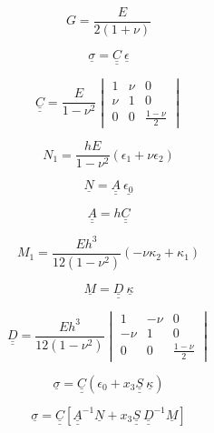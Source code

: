 		\begin{equation}
		G = \frac{E}{2(1+\nu)}
		\end{equation}

		\begin{equation}\label{eq:2.88}
		\underline{\sigma} = \underline{\underline{C}}\ \underline{\epsilon}
		\end{equation}

		\begin{equation}
		\underline{\underline{C}} = \frac{E}{1-\nu^2}
		\begin{vmatrix}
		  1 & \nu & 0 \\
		  \nu & 1 & 0 \\
		  0 & 0 & \frac{1-\nu}{2}
		\end{vmatrix}
		\end{equation}

		\begin{equation}\label{eq:2.90}
		N_1 = \frac{hE}{1-\nu^2} \left( \epsilon_1 + \nu \epsilon_2 \right)
		\end{equation}

		\begin{equation}\label{eq2.107}
		\underline{N} = \underline{\underline{A}} \ \underline{\epsilon_0}
		\end{equation}
				
		\begin{equation}
		\underline{\underline{A}} = h\underline{\underline{C}}
		\end{equation}

		\begin{equation}
		M_1 = \frac{Eh^3}{12(1-\nu^2)} \left( -\nu \kappa_2 + \kappa_1 \right)
		\end{equation}

		\begin{equation}\label{eq2.110}
		\underline{M} = \underline{\underline{D}} \ \underline{\kappa}
		\end{equation}

		\begin{equation}
		\underline{\underline{D}} = \frac{Eh^3}{12(1-\nu^2)}
		\begin{vmatrix}
		  1 & -\nu & 0 \\
		  -\nu & 1 & 0 \\
		  0  & 0 & \frac{1-\nu}{2}
		\end{vmatrix}
		\end{equation}

		\begin{equation}
		\underline{\sigma} = \underline{\underline{C}} \left( \epsilon_0 + x_3 \underline{\underline{S}} \ \underline{\kappa} \right)
		\end{equation}

		\begin{equation}
		\underline{\sigma} = \underline{\underline{C}} \left[ \underline{\underline{A}}^{-1} \underline{N} + x_3 \underline{\underline{S}} \ \underline{\underline{D}}^{-1} \underline{M} \right]
		\end{equation}




















